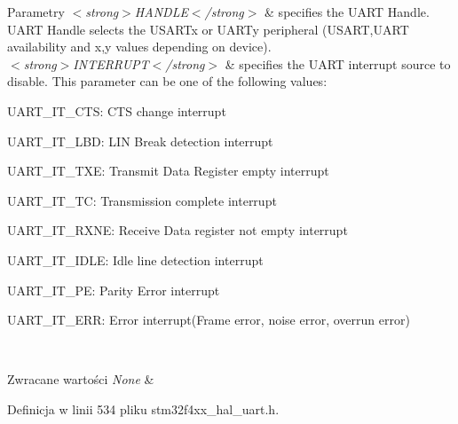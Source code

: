 \begin{DoxyParams}{Parametry}
{\em $<$strong$>$\+H\+A\+N\+D\+L\+E$<$/strong$>$} & specifies the U\+A\+RT Handle. U\+A\+RT Handle selects the U\+S\+A\+R\+Tx or U\+A\+R\+Ty peripheral (U\+S\+A\+RT,U\+A\+RT availability and x,y values depending on device). \\
\hline
{\em $<$strong$>$\+I\+N\+T\+E\+R\+R\+U\+P\+T$<$/strong$>$} & specifies the U\+A\+RT interrupt source to disable. This parameter can be one of the following values\+: \begin{DoxyItemize}
\item U\+A\+R\+T\+\_\+\+I\+T\+\_\+\+C\+TS\+: C\+TS change interrupt \item U\+A\+R\+T\+\_\+\+I\+T\+\_\+\+L\+BD\+: L\+IN Break detection interrupt \item U\+A\+R\+T\+\_\+\+I\+T\+\_\+\+T\+XE\+: Transmit Data Register empty interrupt \item U\+A\+R\+T\+\_\+\+I\+T\+\_\+\+TC\+: Transmission complete interrupt \item U\+A\+R\+T\+\_\+\+I\+T\+\_\+\+R\+X\+NE\+: Receive Data register not empty interrupt \item U\+A\+R\+T\+\_\+\+I\+T\+\_\+\+I\+D\+LE\+: Idle line detection interrupt \item U\+A\+R\+T\+\_\+\+I\+T\+\_\+\+PE\+: Parity Error interrupt \item U\+A\+R\+T\+\_\+\+I\+T\+\_\+\+E\+RR\+: Error interrupt(\+Frame error, noise error, overrun error) \end{DoxyItemize}
\\
\hline
\end{DoxyParams}

\begin{DoxyRetVals}{Zwracane wartości}
{\em None} & \\
\hline
\end{DoxyRetVals}


Definicja w linii 534 pliku stm32f4xx\+\_\+hal\+\_\+uart.\+h.

\mbox{\label{group___u_a_r_t___exported___macros_ga49eb5ea4996a957afeb8be2793ba3fe9}} 
